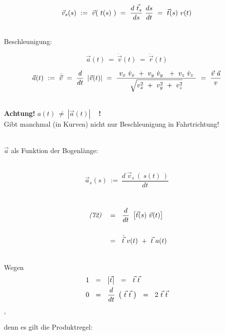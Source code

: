 \begin{flushleft}
\[ \vec{v}_{s} (s) ~ := ~ \vec{v} ( ~ t(s) ~ ) ~ = ~ \frac{d ~ \vec{t}_s }{ds} ~ \frac{ds}{dt} ~ = ~ \vec{t} (s) ~ v(t) \]

\textbf{\iec}

~\\

Beschleunigung:

\[ \vec{a} (t) ~ = ~ \dot{\vec{v}} (t) ~ = ~ \ddot{\vec{r}} (t) \]

\iec

\[ \vec{a} (t) ~ := ~ \dot{\vec{v}} ~ = ~ \frac{d}{dt} ~ \left| \vec{v} (t) \right| ~ = ~ \frac{ ~ v_x ~ \dot{v}_x ~ + ~ v_y ~ \dot{v}_y ~ ~ + ~ v_z ~ \dot{v}_z ~ }{ \sqrt{ v_{x}^{2}  ~ + ~ v_{y}^{2} ~ + ~ v_{z}^{2} } } ~ = ~ \frac{\vec{v} ~ \vec{a}}{v} \]

\iec

~\\

\textbf{Achtung!} \qquad $ a(t) ~ \neq ~ \left| \vec{a} (t) \right| $ ~ \textbf{!}
~\\
Gibt manchmal (in Kurven) nicht nur Beschleunigung in Fahrtrichtung!

~\\

$\vec{a}$ als Funktion der Bogenlänge:

~\\

\[ \vec{a}_s (s) ~ := ~ \frac{d ~ \vec{v}_s ~ (~ s(t) ~)}{ dt } \]

~\\

\begin{align*}
	\text{ \textit{(72)} } ~~ &= ~~ \frac{d}{dt} ~ \left[ \vec{t} (s) ~ \vec{v} (t) \right] \\ \\
	&= ~~ \dot{\vec{t}} ~ v(t) ~ + ~ \vec{t} ~ a(t)
\end{align*}

\iec

~\\

Wegen \begin{align*}
	1 ~~ &= ~~ \left| \vec{t} \right| ~~ = ~~ \vec{t} ~ \vec{t} \\
	0 ~~ &= ~~ \frac{d}{dt} ~ \left( ~ \vec{t} ~ \vec{t} ~ \right) ~~ = ~~ 2 ~ \vec{t} ~ \vec{t}
\end{align*} ,

\iec

denn es gilt die Produktregel: 

~\\


\end{flushleft}

